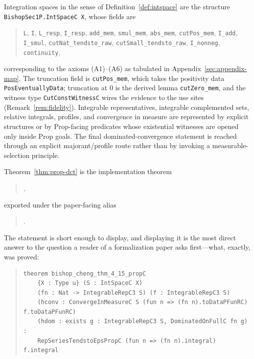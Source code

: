 \documentclass[11pt]{article}
\theoremstyle{definition}
\theoremstyle{remark}
\begin{document}
Integration spaces in the sense of Definition~\ref{def:intspace} are the structure \texttt{BishopSec1P.IntSpaceC X}, whose fields are
\begin{quote}\small\raggedright
\texttt{L}, \texttt{I}, \texttt{L\_resp}, \texttt{I\_resp}, \texttt{add\_mem}, \texttt{smul\_mem}, \texttt{abs\_mem}, \texttt{cutPos\_mem},
\texttt{I\_add}, \texttt{I\_smul}, \texttt{cutNat\_tendsto\_raw}, \texttt{cutSmall\_tendsto\_raw}, \texttt{I\_nonneg}, \texttt{continuity},
\end{quote}
corresponding to the axioms (A1)--(A6) as tabulated in Appendix~\ref{sec:appendix-map}.  The truncation field is \texttt{cutPos\_mem}, which takes the positivity data \texttt{PosEventuallyData}; truncation at $0$ is the derived lemma \texttt{cutZero\_mem}, and the witness type \texttt{CutConstWitnessC} wires the evidence to the use sites (Remark~\ref{rem:fidelity}).  Integrable representatives, integrable complemented sets, relative integrals, profiles, and convergence in measure are represented by explicit structures or by Prop-facing predicates whose existential witnesses are opened only inside Prop goals.  The final dominated-convergence statement is reached through an explicit majorant/profile route rather than by invoking a measurable-selection principle.

Theorem~\ref{thm:prop-dct} is the implementation theorem
\begin{quote}\small\centering
{},
\end{quote}
exported under the paper-facing alias
\begin{quote}\small\centering
{}.
\end{quote}

\noindent The statement is short enough to display, and displaying it is the most direct
answer to the question a reader of a formalization paper asks first---what, exactly, was
proved:

\begin{quote}\small
\begin{verbatim}
theorem bishop_cheng_thm_4_15_propC
    {X : Type u} (S : IntSpaceC X)
    (fn : Nat -> IntegrableRepC3 S) (f : IntegrableRepC3 S)
    (hconv : ConvergeInMeasureC S (fun n => (fn n).toDataPFunRC) f.toDataPFunRC)
    (hdom : exists g : IntegrableRepC3 S, DominatedOnFullC fn g) :
    RepSeriesTendstoEpsPropC (fun n => (fn n).integral) f.integral
\end{verbatim}
\end{quote}
\end{document}
